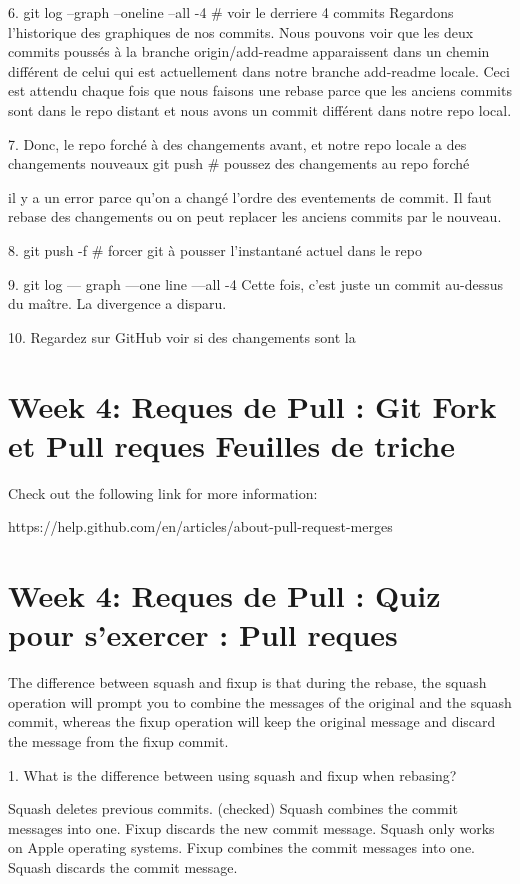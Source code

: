 \documentclass[11pt, onecolumn]{article}
\begin{document}
6. git log --graph --oneline --all -4    # voir le derriere 4 commits
Regardons l'historique des graphiques de nos commits. Nous pouvons voir que les deux commits poussés à la branche origin/add-readme apparaissent dans un chemin différent de celui qui est actuellement dans notre branche add-readme locale. Ceci est attendu chaque fois que nous faisons une rebase parce que les anciens commits sont dans le repo distant et nous avons un commit différent dans notre repo local. 

7. Donc, le repo forché à des changements avant, et notre repo locale a des changements nouveaux
git push      # poussez des changements au repo forché

il y a un error parce qu'on a changé l'ordre des eventements de commit. Il faut rebase des changements ou on peut replacer les anciens commits par le nouveau. 

8. git push -f     # forcer git à pousser l'instantané actuel dans le repo

9. git log — graph —one line —all -4 
Cette fois, c'est juste un commit au-dessus du maître. La divergence a disparu. 

10. Regardez sur GitHub voir si des changements sont la


\section{Week 4: Reques de Pull : Git Fork et Pull reques Feuilles de triche}

Check out the following link for more information:

https://help.github.com/en/articles/about-pull-request-merges


\section{Week 4: Reques de Pull : Quiz pour s'exercer : Pull reques}

The difference between squash and fixup is that during the rebase, the squash operation will prompt you to combine the messages of the original and the squash commit, whereas the fixup operation will keep the original message and discard the message from the fixup commit.

1. What is the difference between using squash and fixup when rebasing?

Squash deletes previous commits.
(checked) Squash combines the commit messages into one. Fixup discards the new commit message.
Squash only works on Apple operating systems.
Fixup combines the commit messages into one. Squash discards the commit message.
\end{document}
